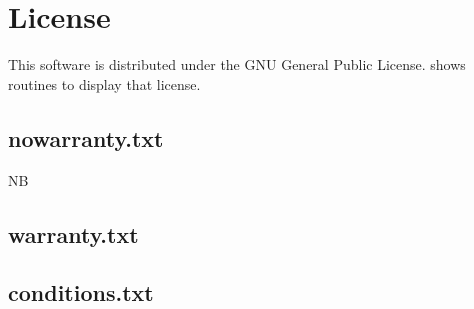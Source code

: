 \documentclass[twocolumn,global]{sys/svjour}
\newcommand{\ME}{NB} %
\begin{document}

{\footnotesize }

\appendix

\section{License}\label{sec:license}

This software is distributed under the  GNU General Public License.
 shows routines to display that license.

\subsection{nowarranty.txt}\label{sec:nowar}
{\scriptsize \ME~ 

}

\subsection{warranty.txt}\label{sec:war}
{\scriptsize

}

\subsection{conditions.txt}\label{sec:cond}
{\scriptsize

}
\end{document}
